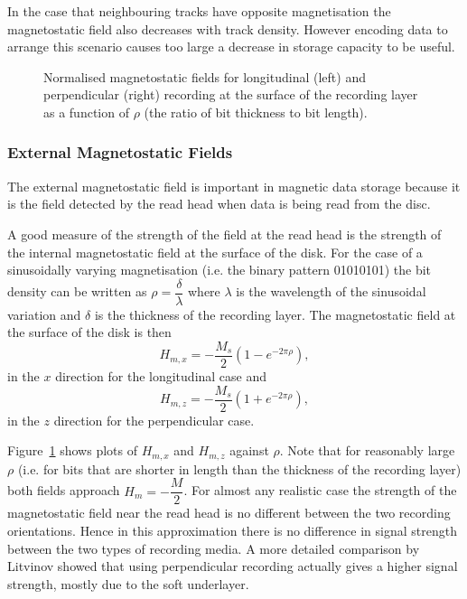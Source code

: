 In the case that neighbouring tracks have opposite magnetisation the
magnetostatic field also decreases with track density. However encoding data to
arrange this scenario causes too large a decrease in storage capacity to be
useful. \cite{Litvinov2002}

\begin{figure}
  \begin{center}
    \hspace{-5em} %
     
    \caption{Normalised magnetostatic fields for longitudinal (left) and perpendicular (right) recording at the surface of the recording layer as a function of $\rho$ (the ratio of bit thickness to bit length).}
    \label{fig:surface-demag}
  \end{center}
\end{figure}

\subsubsection{External Magnetostatic Fields}
\label{sec:Stray-fields}

The external magnetostatic field is important in magnetic data storage because
it is the field detected by the read head when data is being read from the
disc. \cite{Richter1999}

A good measure of the strength of the field at the read head is the strength of
the internal magnetostatic field at the surface of the disk. For the case of a
sinusoidally varying magnetisation (i.e. the binary pattern 01010101) the bit
density can be written as $\rho=\dfrac{\delta}{\lambda}$ where $\lambda$ is the
wavelength of the sinusoidal variation and $\delta$ is the thickness of the recording
layer. The magnetostatic field at the surface of the disk is then
\[ H_{m,x}=-\frac{M_s}{2}(1-e^{-2\pi\rho}),\]
in the $x$ direction for the longitudinal case and
\[ H_{m,z}=-\frac{M_s}{2}(1+e^{-2\pi\rho}),\]
in the $z$ direction for the perpendicular case. \cite{Richter1999}


Figure~\ref{fig:surface-demag} shows plots of $H_{m,x}$ and $H_{m,z}$ against
$\rho$. Note that for reasonably large $\rho$ (i.e. for bits that are shorter in
length than the thickness of the recording layer) both fields approach
$H_{m}=-\dfrac{M}{2}$. For almost any realistic case the strength of the
magnetostatic field near the read head is no different between the two recording
orientations. Hence in this approximation there is no difference in signal
strength between the two types of recording media. A more detailed comparison by
Litvinov \cite{Litvinov2005a} showed that using perpendicular recording actually
gives a higher signal strength, mostly due to the soft underlayer.

